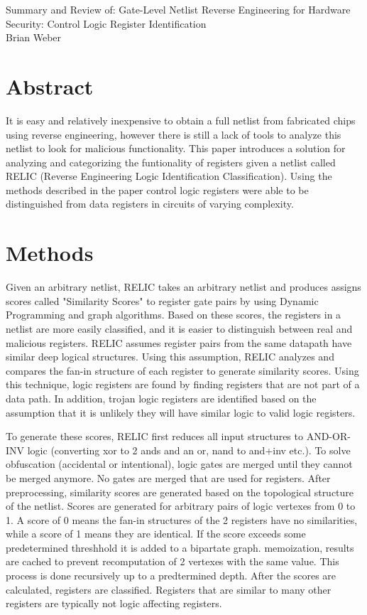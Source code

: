 \documentclass[12pt]{article}
\begin{document}
\begin{center}
\Large Summary and Review of: Gate-Level Netlist Reverse Engineering for
Hardware Security: Control Logic Register Identification\\
\normalsize Brian Weber
\end{center}
\section{Abstract}
It is easy and relatively inexpensive to obtain a full netlist from fabricated
chips using reverse engineering, however there is still a lack of tools to
analyze this netlist to look for malicious functionality. This paper introduces
a solution for analyzing and categorizing the funtionality of registers given a
netlist called RELIC (Reverse Engineering Logic Identification Classification).
Using the methods described in the paper control logic registers were able to be
distinguished from data registers in circuits of varying complexity.

\section{Methods}
Given an arbitrary netlist, RELIC takes an arbitrary netlist and produces
assigns scores called "Similarity Scores" to register gate pairs by using
Dynamic Programming and graph algorithms. Based on these scores, the registers
in a netlist are more easily classified, and it is easier to distinguish between
real and malicious registers. RELIC assumes register pairs from the same
datapath have similar deep logical structures. Using this assumption, RELIC
analyzes and compares the fan-in structure of each register to generate
similarity scores. Using this technique, logic registers are found by finding
registers that are not part of a data path. In addition, trojan logic registers
are identified based on the assumption that it is unlikely they will have
similar logic to valid logic registers.

To generate these scores, RELIC first reduces all input structures to AND-OR-INV
logic (converting xor to 2 ands and an or, nand to and+inv etc.). To solve
obfuscation (accidental or intentional), logic gates are merged until they
cannot be merged anymore. No gates are merged that are used for registers. After
preprocessing, similarity scores are generated based on the topological
structure of the netlist. Scores are generated for arbitrary pairs of logic
vertexes from 0 to 1. A score of 0 means the fan-in structures of the 2 
registers have no similarities, while a score of 1 means they are identical. If 
the score exceeds some predetermined threshhold it is added to a bipartate graph.    
memoization, results are cached to prevent recomputation of 2 vertexes with the
same value. This process is done recursively up to a predtermined depth. After
the scores are calculated, registers are classified. Registers that are similar
to many other registers are typically not logic affecting registers. 
\end{document}
